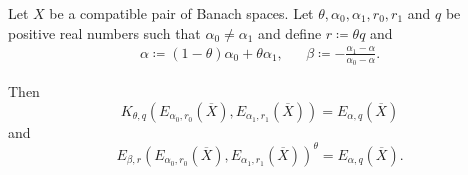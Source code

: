 \begin{theorem}\label{thm:interpolation_space_and_approximation_space_reiteration}
  Let \( X \) be a compatible pair of Banach spaces. Let \( \theta, \alpha_0, \alpha_1, r_0, r_1 \) and \( q \) be positive real numbers such that \( \alpha_0 \neq \alpha_1 \) and define \( r \coloneqq \theta q \) and
  \begin{align*}
    \alpha \coloneqq (1 - \theta) \alpha_0 + \theta \alpha_1,
    &&
    \beta \coloneqq - \frac {\alpha_1 - \alpha} {\alpha_0 - \alpha}.
  \end{align*}

  Then
  \begin{equation*}
    K_{\theta,q}(E_{\alpha_0,r_0}(\overline{X}), E_{\alpha_1,r_1}(\overline{X})) = E_{\alpha,q}(\overline{X})
  \end{equation*}
  and
  \begin{equation*}
    E_{\beta,r}(E_{\alpha_0,r_0}(\overline{X}), E_{\alpha_1,r_1}(\overline{X}))^\theta = E_{\alpha,q}(\overline{X}).
  \end{equation*}
\end{theorem}
